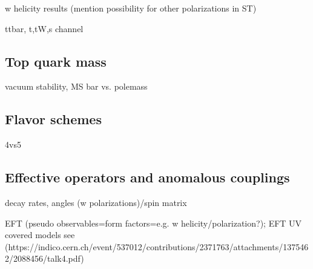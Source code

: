 w helicity results (mention possibility for other polarizations in ST)

ttbar, t,tW,s channel

\subsection{Top quark mass}

vacuum stability, MS bar vs. polemass

\subsection{Flavor schemes}

4vs5

\subsection{Effective operators and anomalous couplings}

decay rates, angles (w polarizations)/spin matrix

EFT (pseudo observables=form factors=e.g. w helicity/polarization?); EFT UV covered models see (https://indico.cern.ch/event/537012/contributions/2371763/attachments/1375462/2088456/talk4.pdf)

